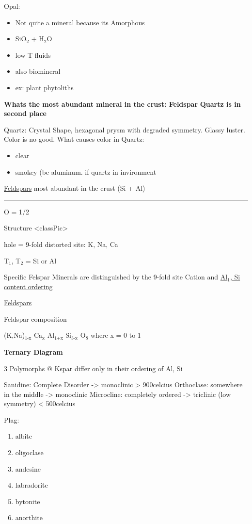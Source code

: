 \documentclass[11pt]{article}
\begin{document}
Opal: 
\begin{itemize}
\item Not quite a mineral because its Amorphous
\item SiO$_{\text{2}}$ + H$_{\text{2}}$O
\item low T fluids
\item also biomineral
\item ex: plant phytoliths
\end{itemize}

\textbf{Whats the most abundant mineral in the crust: Feldspar}
\textbf{Quartz is in second place}

Quartz: Crystal Shape, hexagonal prysm with degraded symmetry. Glassy luster.
Color is no good. 
What causes color in Quartz: 
\begin{itemize}
\item clear
\item smokey (bc aluminum. if quartz in invironment
\end{itemize}

\uline{Feldspars}
most abundant in the crust
(Si + Al)

\rule{\linewidth}{0.5pt}
O                = 1/2


Structure
<classPic>

hole = 9-fold distorted site: K, Na, Ca

T$_{\text{1}}$, T$_{\text{2}}$ = Si or Al





Specific Felspar Minerals are distinguished by the 9-fold site Cation
and \uline{Al$_{\text{1}}$, Si content ordering}

\uline{Feldspars}

Feldspar composition

(K,Na)$_{\text{1-x}}$ Ca$_{\text{x}}$ Al$_{\text{1+x}}$ Si$_{\text{3-x}}$ O$_{\text{8}}$
where x = 0 to 1

\textbf{Ternary Diagram}


3 Polymorphs @ Kspar
differ only in their ordering of Al, Si

Sanidine: Complete Disorder -> monoclinic > 900celcius
Orthoclase: somewhere in the middle    -> monoclinic
Microcline: completely ordered -> triclinic (low symmetry) < 500celcius

Plag:
\begin{enumerate}
\item albite
\item oligoclase
\item andesine
\item labradorite
\item bytonite
\item anorthite
\end{enumerate}
\end{document}
